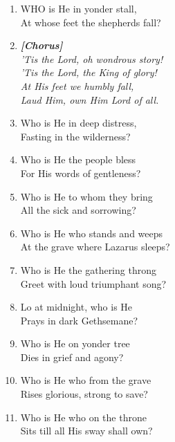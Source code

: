\begin{enumerate}
    \item WHO is He in yonder stall, \\
        At whose feet the shepherds fall?

    \item[] \vspace{0.4em}
    \textbf{\textit{[Chorus]}} \\
    \textit{'Tis the Lord, oh wondrous story!} \\
    \textit{'Tis the Lord, the King of glory!} \\
    \textit{At His feet we humbly fall,} \\
    \textit{Laud Him, own Him Lord of all.}
    \vspace{0.4em}

    \item Who is He in deep distress, \\
        Fasting in the wilderness?

    \item Who is He the people bless \\
        For His words of gentleness?

    \item Who is He to whom they bring \\
        All the sick and sorrowing?

    \item Who is He who stands and weeps \\
        At the grave where Lazarus sleeps?

    \item Who is He the gathering throng \\
        Greet with loud triumphant song?

    \item Lo at midnight, who is He \\
        Prays in dark Gethsemane?

    \item Who is He on yonder tree \\
        Dies in grief and agony?

    \item Who is He who from the grave \\
        Rises glorious, strong to save?

    \item Who is He who on the throne \\
        Sits till all His sway shall own?

\end{enumerate}

